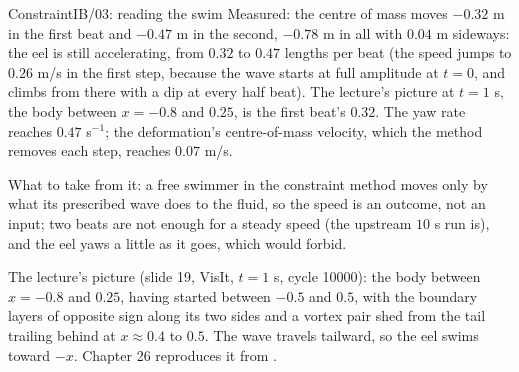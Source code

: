 \documentclass[aspectratio=169,11pt]{beamer}
\begin{document}
\begin{frame}{ConstraintIB/03: reading the swim}
\label{fr:ex03d}
\footnotesize
Measured: the centre of mass moves $-0.32$ m in the first beat and $-0.47$ m in the second, $-0.78$ m in all with $0.04$ m sideways: the eel is still accelerating, from $0.32$ to $0.47$ lengths per beat (the speed jumps to $0.26$ m/s in the first step, because the wave starts at full amplitude at $t = 0$, and climbs from there with a dip at every half beat). The lecture's picture at $t = 1$ s, the body between $x = -0.8$ and $0.25$, is the first beat's $0.32$. The yaw rate reaches $0.47$ s$^{-1}$; the deformation's centre-of-mass velocity, which the method removes each step, reaches $0.07$ m/s.
\vspace{2mm}

\footnotesize What to take from it: a free swimmer in the constraint method moves only by what its prescribed wave does to the fluid, so the speed is an outcome, not an input; two beats are not enough for a steady speed (the upstream $10$ s run is), and the eel yaws a little as it goes, which  would forbid.
\vspace{2mm}

\scriptsize The lecture's picture (slide 19, VisIt, $t = 1$ s, cycle 10000): the body between $x = -0.8$ and $0.25$, having started between $-0.5$ and $0.5$, with the boundary layers of opposite sign along its two sides and a vortex pair shed from the tail trailing behind at $x \approx 0.4$ to $0.5$. The wave travels tailward, so the eel swims toward $-x$. Chapter 26 reproduces it from .
\end{frame}
\end{document}
